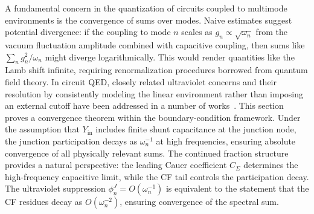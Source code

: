 \documentclass[reprint, floatfix, superscriptaddress, amsmath, amssymb, longbibliography]{revtex4-2}
\newcommand{\Yin}{Y_{\mathrm{in}}}
\begin{document}
A fundamental concern in the quantization of circuits coupled to multimode environments is the convergence of sums over modes. Naive estimates suggest potential divergence: if the coupling to mode $n$ scales as $g_n \propto \sqrt{\omega_n}$ from the vacuum fluctuation amplitude combined with capacitive coupling, then sums like $\sum_n g_n^2/\omega_n$ might diverge logarithmically. This would render quantities like the Lamb shift infinite, requiring renormalization procedures borrowed from quantum field theory. In circuit QED, closely related ultraviolet concerns and their resolution by consistently modeling the linear environment rather than imposing an external cutoff have been addressed in a number of works~\cite{Paladino2003, Gely2017, Malekakhlagh2016, Malekakhlagh2017, ParraRodriguez2018}. This section proves a convergence theorem within the boundary-condition framework. Under the assumption that $\Yin$ includes finite shunt capacitance at the junction node, the junction participation decays as $\omega_n^{-1}$ at high frequencies, ensuring absolute convergence of all physically relevant sums. The continued fraction structure provides a natural perspective: the leading Cauer coefficient $C_\Sigma$ determines the high-frequency capacitive limit, while the CF tail controls the participation decay. The ultraviolet suppression $\phi_n^J = O(\omega_n^{-1})$ is equivalent to the statement that the CF residues decay as $O(\omega_n^{-2})$, ensuring convergence of the spectral sum.


\end{document}
